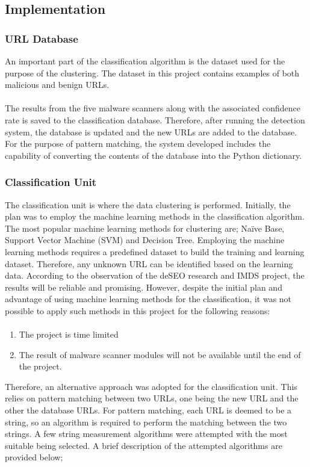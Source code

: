 
\subsection{Implementation}

\subsubsection{URL Database}

An important part of the classification algorithm is the dataset used for the purpose of the clustering. The dataset in this project contains examples of both malicious and benign URLs. 

\paragraph{} 
The results from the five malware scanners along with the associated confidence rate is saved to the classification database. Therefore, after running the detection system, the database is updated and the new URLs are added to the database. For the purpose of pattern matching, the system developed includes the capability of converting the contents of the database into the Python dictionary.

\subsubsection{Classification Unit}
 
The classification unit is where the data clustering is performed. Initially, the plan was to employ the machine learning methods in the classification algorithm. The most popular machine learning methods for clustering are; Naïve Base, Support Vector Machine (SVM) and Decision Tree. Employing the machine learning methods requires a predefined dataset to build the training and learning dataset. Therefore, any unknown URL can be identified based on the learning data. According to the observation of the deSEO research and IMDS project, the results will be reliable and promising\cite{deseo}.
However, despite the initial plan and advantage of using machine learning methods for the classification, it was not possible to apply such methods in this project for the following reasons:
\paragraph{}
\begin{enumerate} 
\item The project is time limited 
\item The result of malware scanner modules will not be available until the end of the project.
\end{enumerate}
Therefore, an alternative approach was adopted for the classification unit. This relies on pattern matching between two URLs, one being the new URL and the other the database URLs. For pattern matching, each URL is deemed to be a string, so an algorithm is required to perform the matching between the two strings. A few string measurement algorithms were attempted with the most suitable being selected. A brief description of the attempted algorithms are provided below;

